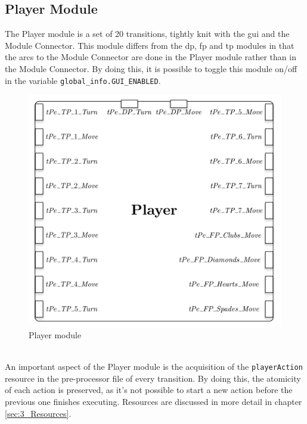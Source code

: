 \documentclass[runningheads,a4paper]{llncs}
\begin{document}
\subsection{Player Module}
The Player module is a set of 20 transitions, tightly knit with the \ac{gui} and the Module Connector. This module differs from the \ac{dp}, \ac{fp} and \ac{tp} modules in that the arcs to the Module Connector are done in the Player module rather than in the Module Connector. By doing this, it is possible to toggle this module on/off in the variable \verb!global_info.GUI_ENABLED!.
\begin{figure}
	\begin{center}
		\includegraphics[scale=0.6]{images/playerModule}
		\caption{Player module}
		\label{fig:player_module}
	\end{center}
\end{figure}\\
An important aspect of the Player module is the acquisition of the \verb!playerAction! resource in the pre-processor file of every transition. By doing this, the atomicity of each action is preserved, as it's not possible to start a new action before the previous one finishes executing. Resources are discussed in more detail in chapter \ref{sec:3_Resources}.\\
\end{document}
